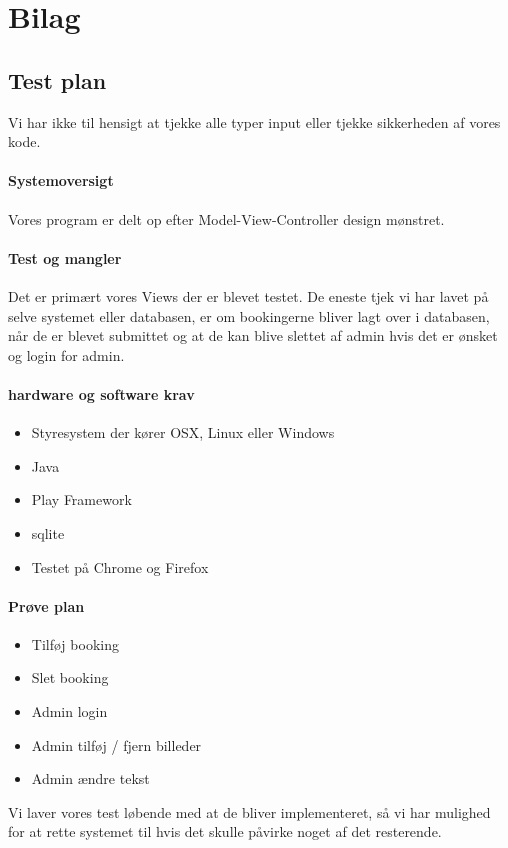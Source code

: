 \documentclass[12pt,a4paper]{article}
\begin{document}
\section{Bilag}
\subsection{Test plan}
Vi har ikke til hensigt at tjekke alle typer input eller tjekke sikkerheden af vores kode. 

\paragraph{Systemoversigt}	
Vores program er delt op efter Model-View-Controller design mønstret. 

\paragraph{Test og mangler}
Det er primært vores Views der er blevet testet. De eneste tjek vi har lavet på selve systemet eller databasen, er om bookingerne bliver lagt over i databasen, når de er blevet submittet og at de kan blive slettet af admin hvis det er ønsket og login for admin. 

\paragraph{hardware og software krav}
\begin{itemize}
	\item Styresystem der kører OSX, Linux eller Windows
	\item Java
	\item Play Framework
	\item sqlite
	\item Testet på Chrome og Firefox
\end{itemize}
\paragraph{Prøve plan}
\begin{itemize}
	\item Tilføj booking
	\item Slet booking
	\item Admin login
	\item Admin tilføj / fjern billeder
	\item Admin ændre tekst
\end{itemize}
Vi laver vores test løbende med at de bliver implementeret, så vi har mulighed for at rette systemet til hvis det skulle påvirke noget af det resterende.
\end{document}
